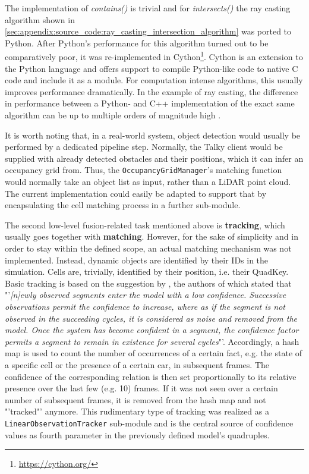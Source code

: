 The implementation of \textit{contains()} is trivial and for \textit{intersects()} the ray casting algorithm shown in \cref{sec:appendix:source_code:ray_casting_intersection_algorithm} was ported to Python. After Python's performance for this algorithm turned out to be comparatively poor, it was re-implemented in Cython\footnote{\url{https://cython.org/}}. Cython is an extension to the Python language and offers support to compile Python-like code to native C code and include it as a module. For computation intense algorithms, this usually improves performance dramatically. In the example of ray casting, the difference in performance between a Python- and C++ implementation of the exact same algorithm can be up to multiple orders of magnitude high \cite{Novak2017}.

It is worth noting that, in a real-world system, object detection would usually be performed by a dedicated pipeline step. Normally, the Talky client would be supplied with already detected obstacles and their positions, which it can infer an occupancy grid from. Thus, the \texttt{OccupancyGridManager}'s matching function would normally take an object list as input, rather than a LiDAR point cloud. The current implementation could easily be adapted to support that by encapsulating the cell matching process in a further sub-module.
\par
\bigskip

The second low-level fusion-related task mentioned above is \textbf{tracking}, which usually goes together with \textbf{matching}. However, for the sake of simplicity and in order to stay within the defined scope, an actual matching mechanism was not implemented. Instead, dynamic objects are identified by their IDs in the simulation. Cells are, trivially, identified by their position, i.e. their QuadKey. Basic tracking is based on the suggestion by \cite{Crowley1993}, the authors of which stated that "'\textit{[n]ewly observed segments enter the model with a low confidence. Successive observations permit the confidence to increase, where as if the segment is not observed in the succeeding cycles, it is considered as noise and removed from the model. Once the system has become confident in a segment, the confidence factor permits a segment to remain in existence for several cycles}"'. Accordingly, a hash map is used to count the number of occurrences of a certain fact, e.g. the state of a specific cell or the presence of a certain car, in subsequent frames. The confidence of the corresponding relation is then set proportionally to its relative presence over the last few (e.g. 10) frames. If it was not seen over a certain number of subsequent frames, it is removed from the hash map and not "'tracked"' anymore. This rudimentary type of tracking was realized as a \texttt{LinearObservationTracker} sub-module and is the central source of confidence values  as fourth parameter in the previously defined model's quadruples.
\par
\bigskip

